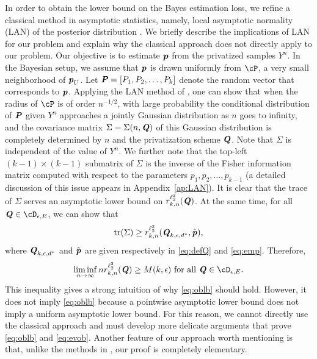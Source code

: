 \documentclass[11pt,onecolumn]{IEEEtran}
\def\mathbi#1{{\textbf{\textit #1}}}
\DeclareMathOperator{\tr}{tr}
\begin{document}
In order to obtain the lower bound on the Bayes estimation loss, we refine a classical method in asymptotic statistics, namely, local asymptotic normality (LAN) of the posterior distribution \cite{LeCam12,Ibrag81,Hajek72}.
We briefly describe the implications of LAN for our problem and explain why the classical approach does not directly apply to our problem.
Our objective is to estimate $\mathbi{p}$ from the privatized samples $Y^n$. In the Bayesian setup, we assume that $\mathbi{p}$ is drawn uniformly from $\cP$, a very small neighborhood of $\mathbi{p}_U$. Let 
$\mathbi{P}=[P_1,P_2,\dots,P_k]$ denote the random vector that corresponds to $\mathbi{p}$. Applying the LAN method of \cite{LeCam12,Ibrag81,Hajek72}, one can show that
when the radius of $\cP$ is of order $n^{-1/2}$, with large probability the conditional distribution of $\mathbi{P}$ given $Y^n$ 
approaches a jointly Gaussian distribution as $n$ goes to infinity, and the covariance matrix $\Sigma=\Sigma(n,\mathbi{Q})$ of this Gaussian distribution is completely determined by $n$ and the privatization scheme $\mathbi{Q}$. Note that $\Sigma$ is independent of the value of $Y^n$. 
We further note that the top-left $(k-1)\times (k-1)$ submatrix of $\Sigma$ is the inverse of the Fisher information matrix computed with
respect to the parameters $p_1,p_2,\dots,p_{k-1}$ (a detailed discussion of this issue appears in Appendix~\ref{ap:LAN}).
It is clear that the trace of $\Sigma$ serves an asymptotic lower bound on $r_{k,n}^{\ell_2^2} (\mathbi{Q})$. 
At the same time, for all $\mathbi{Q} \in \cD_{\epsilon,E}$, we can show that 
$$
\tr(\Sigma) \ge r_{k,n}^{\ell_2^2} (\mathbi{Q}_{k,\epsilon,d^\ast}, \hat{\mathbi{p}}),
$$
where $\mathbi{Q}_{k,\epsilon,d^\ast}$ and $\hat{\mathbi{p}}$ are given respectively in \eqref{eq:defQ} and \eqref{eq:emp}.
Therefore,
   $$
\liminf_{n\to \infty} n r_{k,n}^{\ell_2^2} (\mathbi{Q}) \ge M(k,\epsilon)
\text{~for all~} \mathbi{Q} \in \cD_{\epsilon,E}.
   $$
This inequality gives a strong intuition of why \eqref{eq:oblb} should hold. However, it does not imply \eqref{eq:oblb} because a pointwise asymptotic lower bound does not imply a uniform asymptotic lower bound. For this reason, we cannot directly use
the classical approach and must develop more delicate arguments that prove \eqref{eq:oblb} and \eqref{eq:evob}.
Another feature of our approach worth mentioning is that, unlike the methods in \cite{LeCam12,Ibrag81,Hajek72}, our proof is completely elementary.
\end{document}
